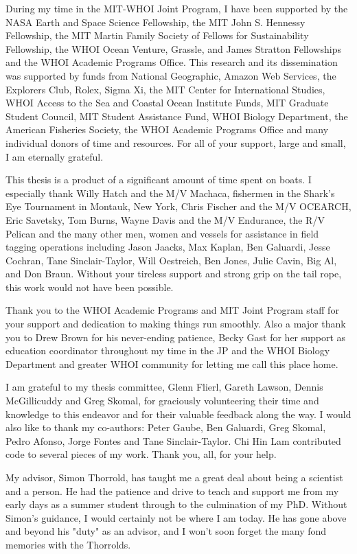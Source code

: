 {\parindent15pt

\singlespace
During my time in the MIT-WHOI Joint Program, I have been supported by the NASA Earth and Space Science Fellowship, the MIT John S. Hennessy Fellowship, the MIT Martin Family Society of Fellows for Sustainability Fellowship, the WHOI Ocean Venture, Grassle, and James Stratton Fellowships and the WHOI Academic Programs Office. This research and its dissemination was supported by funds from National Geographic, Amazon Web Services, the Explorers Club, Rolex, Sigma Xi, the MIT Center for International Studies, WHOI Access to the Sea and Coastal Ocean Institute Funds, MIT Graduate Student Council, MIT Student Assistance Fund, WHOI Biology Department, the American Fisheries Society, the WHOI Academic Programs Office and many individual donors of time and resources. For all of your support, large and small, I am eternally grateful. \par\bigskip

This thesis is a product of a significant amount of time spent on boats. I especially thank Willy Hatch and the M/V Machaca, fishermen in the Shark's Eye Tournament in Montauk, New York, Chris Fischer and the M/V OCEARCH, Eric Savetsky, Tom Burns, Wayne Davis and the M/V Endurance, the R/V Pelican and the many other men, women and vessels for assistance in field tagging operations including Jason Jaacks, Max Kaplan, Ben Galuardi, Jesse Cochran, Tane Sinclair-Taylor, Will Oestreich, Ben Jones, Julie Cavin, Big Al, and Don Braun. Without your tireless support and strong grip on the tail rope, this work would not have been possible.

Thank you to the WHOI Academic Programs and MIT Joint Program staff for your support and dedication to making things run smoothly. Also a major thank you to Drew Brown for his never-ending patience, Becky Gast for her support as education coordinator throughout my time in the JP and the WHOI Biology Department and greater WHOI community for letting me call this place home.

I am grateful to my thesis committee, Glenn Flierl, Gareth Lawson, Dennis McGillicuddy and Greg Skomal, for graciously volunteering their time and knowledge to this endeavor and for their valuable feedback along the way. I would also like to thank my co-authors: Peter Gaube, Ben Galuardi, Greg Skomal, Pedro Afonso, Jorge Fontes and Tane Sinclair-Taylor. Chi Hin Lam contributed code to several pieces of my work. Thank you, all, for your help.

My advisor, Simon Thorrold, has taught me a great deal about being a scientist and a person. He had the patience and drive to teach and support me from my early days as a summer student through to the culmination of my PhD. Without Simon’s guidance, I would certainly not be where I am today. He has gone above and beyond his "duty" as an advisor, and I won't soon forget the many fond memories with the Thorrolds.

}
